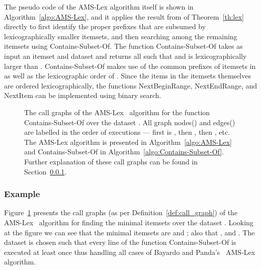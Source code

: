 \documentclass[13pt,a4paper]{article}
\begin{document}
The pseudo code of the AMS-Lex algorithm itself is shown in Algorithm~\ref{algo:AMS-Lex}, and it applies the result from of Theorem~\ref{th:lex} directly to first identify the proper prefixes that are subsumed by lexicographically smaller itemsets, and then searching among the remaining itemsets using Contains-Subset-Of. The function Contains-Subset-Of takes as input an itemset  and dataset  and returns all  such that  and  is lexicographically larger than . Contains-Subset-Of makes use of the common prefixes of itemsets in  as well as the lexicographic order of . Since the items in the itemsets themselves are ordered lexicographically, the functions NextBeginRange, NextEndRange, and NextItem can be implemented using binary search. 


\begin{figure} [t]
	\centering
	\caption{ The call graphs of the AMS-Lex~\cite{BayardoPanda11} algorithm for the function Contains-Subset-Of over the dataset . All graph nodes() and edges() are labelled in the order of executions --- first is , then , then , etc. The AMS-Lex algorithm is presented in Algorithm~\ref{algo:AMS-Lex} and Contains-Subset-Of in Algorithm~\ref{algo:Contains-Subset-Of}. Further explanation of these call graphs can be found in Section~\ref{sec:background:ams-lex:example}.}
	\label{fig:algo:ams-lex:example}
\end{figure}

\subsubsection{Example}
\label{sec:background:ams-lex:example}

Figure~\ref{fig:algo:ams-lex:example} presents the call graphs (as per Definition~\ref{def:call_graph}) of the AMS-Lex~\cite{BayardoPanda11} algorithm for finding the minimal itemsets over the dataset . Looking at the figure we can see that the minimal itemsets are  and ; also that ,  and . The dataset  is chosen such that every line of the function Contains-Subset-Of is executed at least once thus handling all cases of Bayardo and Panda's~\cite{BayardoPanda11} AMS-Lex algorithm. 
\end{document}
